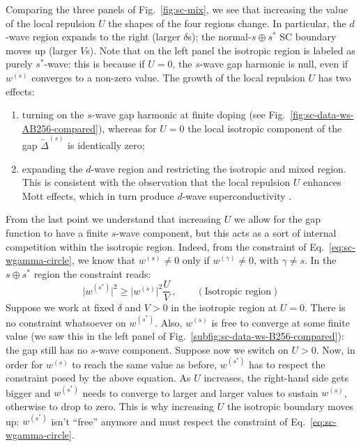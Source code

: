Comparing the three panels of Fig.~\ref{fig:sc-mix}, we see that increasing the value of the local repulsion $U$
the shapes of the four regions change. In particular, the $d$-wave region expands to the right (larger $\delta$s); the normal-$s \oplus s^*$ SC boundary moves up (larger $V$s). Note that on the left panel the isotropic region is labeled as purely $s^*$-wave: this is because if $U=0$, the $s$-wave gap harmonic is null, even if $w^{(s)}$ converges to a non-zero value. The growth of the local repulsion $U$ has two effects:
\begin{enumerate}
	\item turning on the $s$-wave gap harmonic at finite doping (see Fig.~\ref{fig:sc-data-ws-AB256-compared}), whereas for $U=0$ the local isotropic component of the gap $\tilde{\Delta}^{(s)}$ is identically zero;
	\item expanding the $d$-wave region and restricting the isotropic and mixed region. This is consistent with the observation that the local repulsion $U$ enhances Mott effects, which in turn produce $d$-wave superconductivity \cite{keimer2015quantum}.
\end{enumerate}
From the last point we understand that increasing $U$ we allow for the gap function to have a finite $s$-wave component, but this acts as a sort of internal competition within the isotropic region. Indeed, from the constraint of Eq.~\eqref{eq:sc-wgamma-circle}, we know that $w^{(s)} \neq 0$ only if $w^{(\gamma)} \neq 0$, with $\gamma \neq s$. In the $s \oplus s^*$ region the constraint reads:
\[
	\big| w^{(s^*)} \big|^2 \ge \big| w^{(s)} \big|^2 \frac{U}{V} \, ,
	\qquad
	(\text{Isotropic region})
\] 
Suppose we work at fixed $\delta$ and $V>0$ in the isotropic region at $U=0$. There is no constraint whatsoever on $w^{(s^*)}$. Also, $w^{(s)}$ is free to converge at some finite value (we saw this in the left panel of Fig.~\ref{subfig:sc-data-ws-B256-compared}): the gap still has no $s$-wave component. Suppose now we switch on $U>0$. Now, in order for $w^{(s)}$ to reach the same value as before, $w^{(s^*)}$ has to respect the constraint posed by the above equation. As $U$ increases, the right-hand side gets bigger and $w^{(s^*)}$ needs to converge to larger and larger values to sustain $w^{(s)}$, otherwise to drop to zero. This is why increasing $U$ the isotropic boundary moves up: $w^{(s^*)}$ isn't ``free'' anymore and must respect the constraint of Eq.~\eqref{eq:sc-wgamma-circle}.

